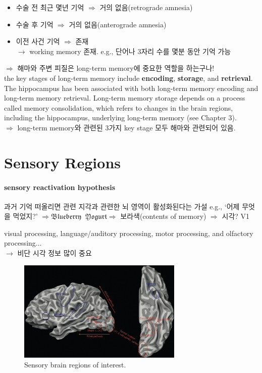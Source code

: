 \documentclass[../note.tex]{subfiles}
\begin{document}
\begin{itemize}
  \item 수술 전 최근 몇년 기억 $\Rightarrow$ 거의 없음(retrograde amnesia)
  \item 수술 후 기억 $\Rightarrow$ 거의 없음(anterograde amnesia)
  \item 이전 사건 기억 $\Rightarrow$ 존재\\
    $\longrightarrow$ working memory 존재. e.g., 단어나 3자리 수를 몇분 동안 기억 가능
\end{itemize}

$\Longrightarrow$ 해마와 주변 피질은 long-term memory에 중요한 역할을 하는구나!\\

the key stages of long-term memory include \textbf{encoding}, \textbf{storage}, and \textbf{retrieval}.
The hippocampus has been associated with both long-term memory encoding and long-term memory retrieval.
Long-term memory storage depends on a process called
memory consolidation, which refers to changes in the brain regions,
including the hippocampus, underlying long-term memory (see
Chapter 3).\\
$\Longrightarrow$ long-term memory와 관련된 3가지 key stage 모두 해마와 관련되어 있음.

\section{Sensory Regions}
\label{ch1:sec:sensory_regions}
\paragraph{sensory reactivation hypothesis}
과거 기억 떠올리면 관련 지각과 관련한 뇌 영역이 활성화된다는 가설
e.g., `어제 무엇을 먹었지?' $\Rightarrow \mathfrak{Blueberry}\;\;\mathfrak{Yogurt} \Rightarrow$ 보라색(contents of memory) $\Rightarrow$ 시각? V1

visual processing, language/auditory processing, motor processing, and olfactory processing...\\
$\rightarrow$ 비단 시각 정보 많이 중요

\begin{figure}[h]
  \centering
  \includegraphics[width=0.7\textwidth]{image/sensory_regions}
  \caption{Sensory brain regions of interest.}
  \label{fig:sensory_regions}
\end{figure}
\end{document}
